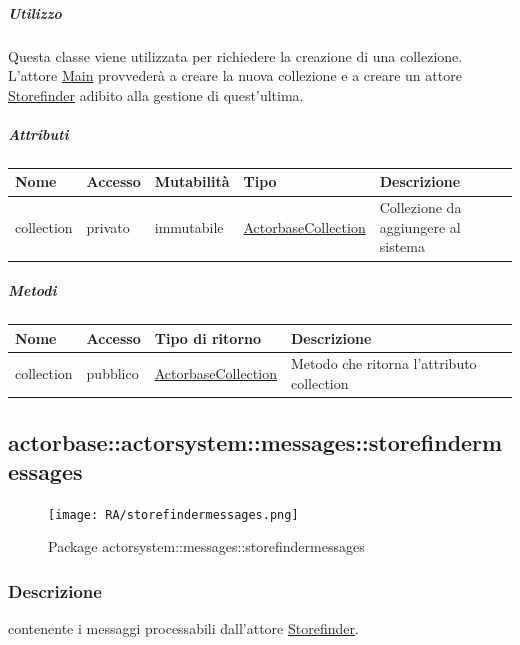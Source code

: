 \documentclass{scalatekids-article}
\begin{document}
\subparagraph{Utilizzo}
Questa classe viene utilizzata per richiedere la creazione di una collezione.\\L'attore
\hyperref[sec:actorbase::actorsystem::actors::main::Main]{Main} provvederà a creare la nuova collezione e a creare un attore \hyperref[sec:actorbase::actorsystem::actors::storefinder::Storefinder]{Storefinder}
adibito alla gestione di quest'ultima.

\subparagraph{Attributi}
\begin{tabular}{| p{2cm} | p{1.5cm} | p{2cm} | p{3cm} | p{8.5cm} |}
  \hline
  Nome & Accesso & Mutabilità & Tipo & Descrizione\\
  \hline
  collection & privato & immutabile & \hyperref[sec:actorbase::actorsystem::utils::ActorbaseCollection]{ActorbaseCollection} & Collezione da aggiungere al sistema\\
  \hline
\end{tabular}

\subparagraph{Metodi}
\begin{tabular}{| p{3cm} | p{1.5cm} | p{3.5cm} | p{9cm} |}
  \hline
  Nome & Accesso & Tipo di ritorno & Descrizione\\
  \hline
  collection & pubblico & \hyperref[sec:actorbase::actorsystem::utils::ActorbaseCollection]{ActorbaseCollection} & Metodo che ritorna l'attributo collection\\
  \hline
\end{tabular}


\subsection{actorbase::actorsystem::messages::storefindermessages}
\label{sec:actorbase::actorsystem::messages::storefindermessages}

\begin{figure}[H]
  \begin{center}
    \texttt{[image: RA/storefindermessages.png]}
    \caption{Package actorsystem::messages::storefindermessages}
  \end{center}
\end{figure}

\subsubsection{Descrizione}
 contenente i messaggi processabili dall'attore \hyperref[sec:actorbase::actorsystem::actors::storefinder::Storefinder]{Storefinder}.
\end{document}
